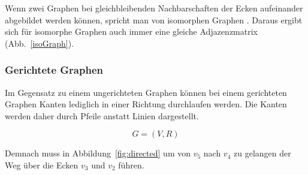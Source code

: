 \documentclass[12pt,a4paper]{article}
\begin{document}
Wenn zwei Graphen bei gleichbleibenden Nachbarschaften der Ecken aufeinander abgebildet werden können, spricht man von isomorphen Graphen \cite[106]{theory}. Daraus ergibt sich für isomorphe Graphen auch immer eine gleiche Adjazenzmatrix (Abb.~\ref{isoGraph}).


\subsubsection{Gerichtete Graphen}
Im Gegensatz zu einem ungerichteten Graphen können bei einem gerichteten Graphen Kanten lediglich in einer Richtung durchlaufen werden. Die Kanten werden daher durch Pfeile anstatt Linien dargestellt. 

$$G = (V,R)$$

Demnach muss in Abbildung~\ref{fig:directed} um von $v_{5}$ nach $v_{4}$ zu gelangen der Weg über die Ecken $v_{3}$ und $v_{2}$ führen.
\end{document}
